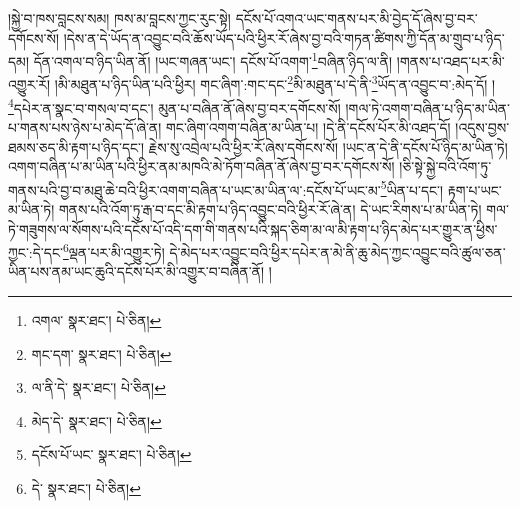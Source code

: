 །སྐྱེ་བ་ཁས་བླངས་སམ། ཁས་མ་བླངས་ཀྱང་རུང་སྟེ། དངོས་པོ་འགའ་ཡང་གནས་པར་མི་བྱེད་དོ་ཞེས་བྱ་བར་དགོངས་སོ། །དེས་ན་དེ་ཡོད་ན་འབྱུང་བའི་ཆོས་ཡོད་པའི་ཕྱིར་རོ་ཞེས་བྱ་བའི་གཏན་ཚིགས་ཀྱི་དོན་མ་གྲུབ་པ་ཉིད་དམ། དོན་འགལ་བ་ཉིད་ཡིན་ནོ། །ཡང་གཞན་ཡང་། དངོས་པོ་འགག་\footnote{འགལ་  སྣར་ཐང་།  པེ་ཅིན། }བཞིན་ཉིད་ལ་ནི། །གནས་པ་འཐད་པར་མི་འགྱུར་རོ། །མི་མཐུན་པ་ཉིད་ཡིན་པའི་ཕྱིར། གང་ཞིག་:གང་དང་\footnote{གང་དག་  སྣར་ཐང་།  པེ་ཅིན། }མི་མཐུན་པ་དེ་ནི་\footnote{ལ་ནི་དེ་  སྣར་ཐང་།  པེ་ཅིན། }ཡོད་ན་འབྱུང་བ་:མེད་དོ། །\footnote{མེད་དེ་  སྣར་ཐང་།  པེ་ཅིན། }དཔེར་ན་སྣང་བ་གསལ་བ་དང་། མུན་པ་བཞིན་ནོ་ཞེས་བྱ་བར་དགོངས་སོ། །གལ་ཏེ་འགག་བཞིན་པ་ཉིད་མ་ཡིན་པ་གནས་པས་ཉེས་པ་མེད་དོ་ཞེ་ན། གང་ཞིག་འགག་བཞིན་མ་ཡིན་པ། །དེ་ནི་དངོས་པོར་མི་འཐད་དོ། །འདུས་བྱས་ཐམས་ཅད་མི་རྟག་པ་ཉིད་དང་། རྗེས་སུ་འབྲེལ་པའི་ཕྱིར་རོ་ཞེས་དགོངས་སོ། །ཡང་ན་དེ་ནི་དངོས་པོ་ཉིད་མ་ཡིན་ཏེ། འགག་བཞིན་པ་མ་ཡིན་པའི་ཕྱིར་ནམ་མཁའི་མེ་ཏོག་བཞིན་ནོ་ཞེས་བྱ་བར་དགོངས་སོ། །ཅི་སྟེ་སྐྱེ་བའི་འོག་ཏུ་གནས་པའི་བྱ་བ་མཐུ་ཆེ་བའི་ཕྱིར་འགག་བཞིན་པ་ཡང་མ་ཡིན་ལ་:དངོས་པོ་ཡང་མ་\footnote{དངོས་པོ་ཡང་  སྣར་ཐང་།  པེ་ཅིན། }ཡིན་པ་དང་། རྟག་པ་ཡང་མ་ཡིན་ཏེ། གནས་པའི་འོག་ཏུ་རྒ་བ་དང་མི་རྟག་པ་ཉིད་འབྱུང་བའི་ཕྱིར་རོ་ཞེ་ན། དེ་ཡང་རིགས་པ་མ་ཡིན་ཏེ། གལ་ཏེ་གཟུགས་ལ་སོགས་པའི་དངོས་པོ་འདི་དག་གི་གནས་པའི་སྐད་ཅིག་མ་ལ་མི་རྟག་པ་ཉིད་མེད་པར་གྱུར་ན་ཕྱིས་ཀྱང་:དེ་དང་\footnote{དེ་  སྣར་ཐང་།  པེ་ཅིན། }ལྡན་པར་མི་འགྱུར་ཏེ། དེ་མེད་པར་འབྱུང་བའི་ཕྱིར་དཔེར་ན་མེ་ནི་ཆུ་མེད་ཀྱང་འབྱུང་བའི་ཚུལ་ཅན་ཡིན་པས་ནམ་ཡང་ཆུའི་དངོས་པོར་མི་འགྱུར་བ་བཞིན་ནོ། །
